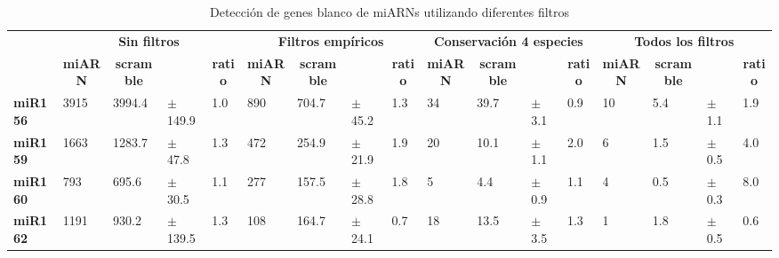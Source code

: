 \begin{landscape}
\begin{table}[]
\scriptsize
\centering
\caption{Detección de genes blanco de miARNs utilizando diferentes filtros}
\label{table:NAR_table_2}
\begin{tabular}{lllllllllllllllll}
\multicolumn{1}{c}{} & \multicolumn{4}{c}{\textbf{Sin filtros}}                        & \multicolumn{4}{c}{\textbf{Filtros empíricos}}                  & \multicolumn{4}{c}{\textbf{Conservación 4 especies}}            & \multicolumn{4}{c}{\textbf{Todos los filtros}}                  \\
\multicolumn{1}{c}{} & \multicolumn{1}{c}{\textbf{miARN}} & \multicolumn{1}{c}{\textbf{scramble}} & \multicolumn{1}{c}{\textbf{}} & \multicolumn{1}{c}{\textbf{ratio}} & \multicolumn{1}{c}{\textbf{miARN}} & \multicolumn{1}{c}{\textbf{scramble}} & \multicolumn{1}{c}{\textbf{}} & \multicolumn{1}{c}{\textbf{ratio}} & \multicolumn{1}{c}{\textbf{miARN}} & \multicolumn{1}{c}{\textbf{scramble}} & \multicolumn{1}{c}{\textbf{}} & \multicolumn{1}{c}{\textbf{ratio}} & \multicolumn{1}{c}{\textbf{miARN}} & \multicolumn{1}{c}{\textbf{scramble}} & \multicolumn{1}{c}{\textbf{}} & \multicolumn{1}{c}{\textbf{ratio}} \\
\textbf{miR156}      & 3915           & 3994.4            & $\pm$ 149.9      & 1.0            & 890            & 704.7             & $\pm$  45.2      & 1.3            & 34             & 39.7              & $\pm$  3.1       & 0.9            & 10             & 5.4               & $\pm$  1.1       & 1.9            \\
\textbf{miR159}      & 1663           & 1283.7            & $\pm$  47.8      & 1.3            & 472            & 254.9             & $\pm$  21.9      & 1.9            & 20             & 10.1              & $\pm$  1.1       & 2.0            & 6              & 1.5               & $\pm$  0.5       & 4.0            \\
\textbf{miR160}      & 793            & 695.6             & $\pm$  30.5      & 1.1            & 277            & 157.5             & $\pm$  28.8      & 1.8            & 5              & 4.4               & $\pm$  0.9       & 1.1            & 4              & 0.5               & $\pm$  0.3       & 8.0            \\
\textbf{miR162}      & 1191           & 930.2             & $\pm$  139.5     & 1.3            & 108            & 164.7             & $\pm$  24.1      & 0.7            & 18             & 13.5              & $\pm$  3.5       & 1.3            & 1              & 1.8               &  $\pm$ 0.5       & 0.6            \\

\end{tabular}
\end{table}
\end{landscape}
